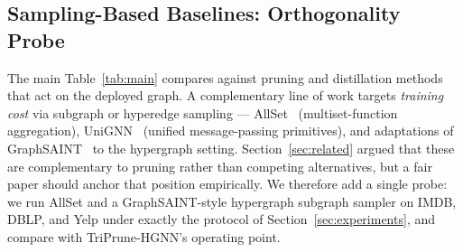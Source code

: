 \documentclass[10pt]{article}
\theoremstyle{plain}
\theoremstyle{definition}
\begin{document}
\subsection{Sampling-Based Baselines: Orthogonality Probe}
\label{sec:sampling}

The main Table~\ref{tab:main} compares against pruning and distillation methods that act on the deployed graph. A complementary line of work targets \emph{training cost} via subgraph or hyperedge sampling --- AllSet~\citep{chien2022you} (multiset-function aggregation), UniGNN~\citep{huang2021unignn} (unified message-passing primitives), and adaptations of GraphSAINT~\citep{zeng2019graphsaint} to the hypergraph setting. Section~\ref{sec:related} argued that these are complementary to pruning rather than competing alternatives, but a fair paper should anchor that position empirically. We therefore add a single probe: we run AllSet and a GraphSAINT-style hypergraph subgraph sampler on IMDB, DBLP, and Yelp under exactly the protocol of Section~\ref{sec:experiments}, and compare with TriPrune-HGNN's operating point.
\end{document}
